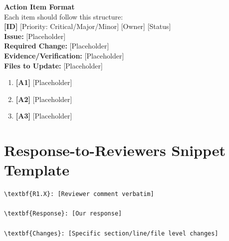 \documentclass[11pt,a4paper]{article}
\newenvironment{scorebox}[1]{%
  \begin{mdframed}[backgroundcolor=lightgray,linecolor=borderblue,linewidth=1.2pt,
                   innertopmargin=6pt,innerbottommargin=6pt,
                   innerleftmargin=10pt,innerrightmargin=10pt]
  \textbf{\color{sectionblue}#1}\\[4pt]
}{%
  \end{mdframed}
}
\begin{document}
\begin{scorebox}{Action Item Format}
Each item should follow this structure:\\
\textbf{[ID]} [Priority: Critical/Major/Minor] [Owner] [Status]\\
\textbf{Issue:} [Placeholder]\\
\textbf{Required Change:} [Placeholder]\\
\textbf{Evidence/Verification:} [Placeholder]\\
\textbf{Files to Update:} [Placeholder]
\end{scorebox}

\begin{enumerate}[leftmargin=2em]
  \item \textbf{[A1]} [Placeholder]
  \item \textbf{[A2]} [Placeholder]
  \item \textbf{[A3]} [Placeholder]
\end{enumerate}

\section{Response-to-Reviewers Snippet Template}

\begin{verbatim}
\textbf{R1.X}: [Reviewer comment verbatim]

\textbf{Response}: [Our response]

\textbf{Changes}: [Specific section/line/file level changes]
\end{verbatim}
\end{document}
